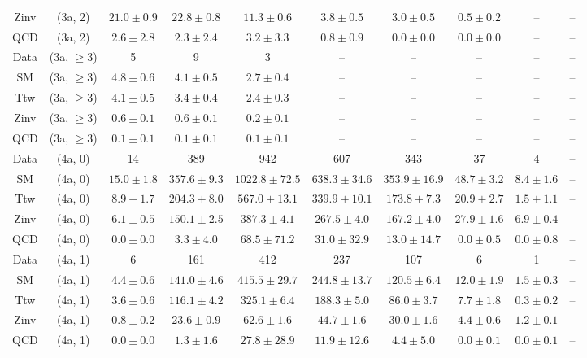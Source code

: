 \begin{table}[h!]
{\begin{tabular}{cccccccccc}
	Zinv & (3a, 2) & $21.0\pm 0.9$ & $22.8\pm 0.8$ & $11.3\pm 0.6$ & $3.8\pm 0.5$ & $3.0\pm 0.5$ & $0.5\pm 0.2$ & -- & -- \\[0.5ex] 
	QCD & (3a, 2) & $2.6\pm 2.8$ & $2.3\pm 2.4$ & $3.2\pm 3.3$ & $0.8\pm 0.9$ & $0.0\pm 0.0$ & $0.0\pm 0.0$ & -- & -- \\[0.5ex] 
	Data & (3a, $\ge3$) & 5 & 9 & 3 & -- & -- & -- & -- & -- \\[0.5ex] 
	SM & (3a, $\ge3$) & $4.8\pm 0.6$ & $4.1\pm 0.5$ & $2.7\pm 0.4$ & -- & -- & -- & -- & -- \\[0.5ex] 
	Ttw & (3a, $\ge3$) & $4.1\pm 0.5$ & $3.4\pm 0.4$ & $2.4\pm 0.3$ & -- & -- & -- & -- & -- \\[0.5ex] 
	Zinv & (3a, $\ge3$) & $0.6\pm 0.1$ & $0.6\pm 0.1$ & $0.2\pm 0.1$ & -- & -- & -- & -- & -- \\[0.5ex] 
	QCD & (3a, $\ge3$) & $0.1\pm 0.1$ & $0.1\pm 0.1$ & $0.1\pm 0.1$ & -- & -- & -- & -- & -- \\[0.5ex] 
	Data & (4a, 0) & 14 & 389 & 942 & 607 & 343 & 37 & 4 & -- \\[0.5ex] 
	SM & (4a, 0) & $15.0\pm 1.8$ & $357.6\pm 9.3$ & $1022.8\pm 72.5$ & $638.3\pm 34.6$ & $353.9\pm 16.9$ & $48.7\pm 3.2$ & $8.4\pm 1.6$ & -- \\[0.5ex] 
	Ttw & (4a, 0) & $8.9\pm 1.7$ & $204.3\pm 8.0$ & $567.0\pm 13.1$ & $339.9\pm 10.1$ & $173.8\pm 7.3$ & $20.9\pm 2.7$ & $1.5\pm 1.1$ & -- \\[0.5ex] 
	Zinv & (4a, 0) & $6.1\pm 0.5$ & $150.1\pm 2.5$ & $387.3\pm 4.1$ & $267.5\pm 4.0$ & $167.2\pm 4.0$ & $27.9\pm 1.6$ & $6.9\pm 0.4$ & -- \\[0.5ex] 
	QCD & (4a, 0) & $0.0\pm 0.0$ & $3.3\pm 4.0$ & $68.5\pm 71.2$ & $31.0\pm 32.9$ & $13.0\pm 14.7$ & $0.0\pm 0.5$ & $0.0\pm 0.8$ & -- \\[0.5ex] 
	Data & (4a, 1) & 6 & 161 & 412 & 237 & 107 & 6 & 1 & -- \\[0.5ex] 
	SM & (4a, 1) & $4.4\pm 0.6$ & $141.0\pm 4.6$ & $415.5\pm 29.7$ & $244.8\pm 13.7$ & $120.5\pm 6.4$ & $12.0\pm 1.9$ & $1.5\pm 0.3$ & -- \\[0.5ex] 
	Ttw & (4a, 1) & $3.6\pm 0.6$ & $116.1\pm 4.2$ & $325.1\pm 6.4$ & $188.3\pm 5.0$ & $86.0\pm 3.7$ & $7.7\pm 1.8$ & $0.3\pm 0.2$ & -- \\[0.5ex] 
	Zinv & (4a, 1) & $0.8\pm 0.2$ & $23.6\pm 0.9$ & $62.6\pm 1.6$ & $44.7\pm 1.6$ & $30.0\pm 1.6$ & $4.4\pm 0.6$ & $1.2\pm 0.1$ & -- \\[0.5ex] 
	QCD & (4a, 1) & $0.0\pm 0.0$ & $1.3\pm 1.6$ & $27.8\pm 28.9$ & $11.9\pm 12.6$ & $4.4\pm 5.0$ & $0.0\pm 0.1$ & $0.0\pm 0.1$ & -- \\[0.5ex] 

\end{tabular}}
\end{table}
